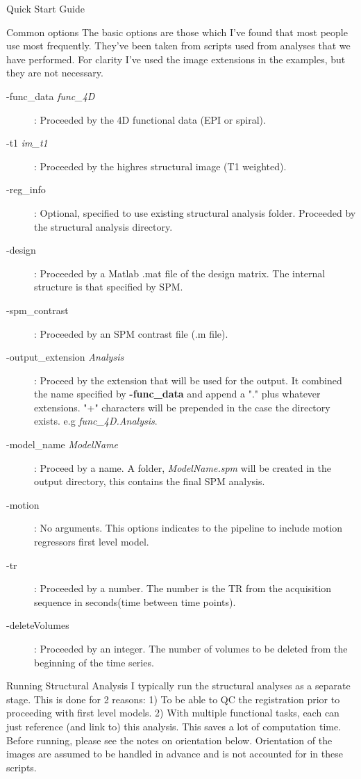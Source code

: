 \documentclass[]{report}
\begin{document}
\begin{chapter}{Quick Start Guide }
\begin{section}{Common options}
The basic options are those which I've found that most people use most frequently. They've been taken from scripts used from analyses that we have performed. For clarity I've used the image extensions in the examples, but they are not necessary.
\begin{description}
	\item [-func\_data {\it func\_4D}] :  Proceeded by the 4D functional data (EPI or spiral).
	\item [ -t1 {\it im\_t1}]  : Proceeded by the highres structural image (T1 weighted). 
	\item [-reg\_info] : Optional, specified to use existing structural analysis folder. Proceeded by the structural analysis directory.
	\item [-design] : Proceeded by a Matlab .mat file of the design matrix. The internal structure is that specified by SPM.
	\item [-spm\_contrast] : Proceeded by an SPM contrast file (.m file).
	\item [-output\_extension {\it Analysis}] : Proceed by the extension that will be used for the output. It combined the name  
						\hspace*{1cm} specified by {\bf -func\_data} and append a "." plus whatever extensions. "+"  characters will be prepended in the case 
						\hspace*{1cm} the directory exists. e.g {\it func\_4D.Analysis}.
	\item[-model\_name {\it ModelName}] : Proceed by a name. A folder, {\it ModelName.spm} will be created in the output directory, this contains the final SPM analysis.
	\item[-motion] : No arguments. This options indicates to the pipeline to include motion regressors first level model.
	\item[-tr] : Proceeded by a number. The number is the TR from the acquisition sequence in seconds(time between time points).
	\item[-deleteVolumes] : Proceeded by an integer. The number of volumes to be deleted from the beginning of the time series.
\end{description}
\end{section}
\begin{section}{Running Structural Analysis}
I typically run the structural analyses as a separate stage. This is done for 2 reasons: 1) To be able to QC the registration prior to proceeding with first level models. 2) With multiple functional tasks, each can just reference (and link to) this analysis. This saves a lot of computation time.  Before running, please see the notes on orientation below. Orientation of the images are assumed to be handled in advance and is not accounted for in these scripts.
\\


\end{section}
\end{chapter}
\end{document}
